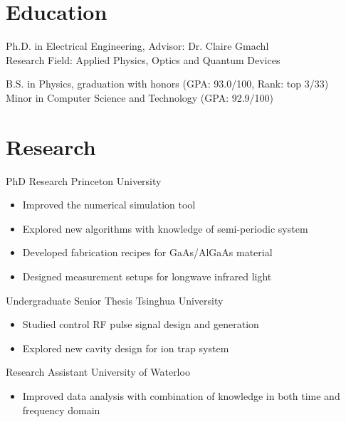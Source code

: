 \documentclass[11pt,letterpaper]{resume}
\begin{document}
\section{Education}

Ph.D. in Electrical Engineering, Advisor: Dr. Claire Gmachl \\
Research Field: Applied Physics, Optics and Quantum Devices

B.S. in Physics, graduation with honors (GPA: 93.0/100, Rank: top 3/33)\\
Minor in Computer Science and Technology (GPA: 92.9/100)


\section{Research}
PhD Research \hfill Princeton University
\begin{itemize}
    \item Improved the numerical simulation tool
    \item Explored new algorithms with knowledge of semi-periodic system
    \item Developed fabrication recipes for GaAs/AlGaAs material 
    \item Designed measurement setups for longwave infrared light
\end{itemize}\medskip

Undergraduate Senior Thesis \hfill Tsinghua University
\begin{itemize}
    \item Studied control RF pulse signal design and generation
    \item Explored new cavity design for ion trap system
\end{itemize}\medskip

Research Assistant \hfill University of Waterloo
\begin{itemize}
    \item Improved data analysis with combination of knowledge in both time and frequency domain
\end{itemize}\medskip
\end{document}
